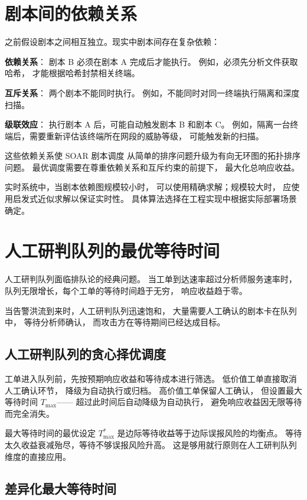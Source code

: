 \documentclass[11pt,a4paper]{article}
\begin{document}
\section{剧本间的依赖关系}

之前假设剧本之间相互独立。现实中剧本间存在复杂依赖：

\textbf{依赖关系}：
剧本 B 必须在剧本 A 完成后才能执行。
例如，必须先分析文件获取哈希，
才能根据哈希封禁相关终端。

\textbf{互斥关系}：
两个剧本不能同时执行。
例如，不能同时对同一终端执行隔离和深度扫描。

\textbf{级联效应}：
执行剧本 A 后，可能自动触发剧本 B 和剧本 C。
例如，隔离一台终端后，需要重新评估该终端所在网段的威胁等级，
可能触发新的扫描。

这些依赖关系使 SOAR 剧本调度
从简单的排序问题升级为有向无环图的拓扑排序问题。
最优调度需要在尊重依赖关系和互斥约束的前提下，
最大化总响应收益。

实时系统中，当剧本依赖图规模较小时，
可以使用精确求解；规模较大时，
应使用启发式近似求解以保证实时性。
具体算法选择在工程实现中根据实际部署场景确定。

\section{人工研判队列的最优等待时间}

人工研判队列面临排队论的经典问题。
当工单到达速率超过分析师服务速率时，
队列无限增长，每个工单的等待时间趋于无穷，
响应收益趋于零。

当告警洪流到来时，人工研判队列迅速饱和，
大量需要人工确认的剧本卡在队列中，
等待分析师确认，
而攻击方在等待期间已经达成目标。

\subsection{人工研判队列的贪心择优调度}

工单进入队列前，先按预期响应收益和等待成本进行筛选。
低价值工单直接取消人工确认环节，
降级为自动执行或归档。
高价值工单保留人工确认，
但设置最大等待时间 \(T_{\max}\)——
超过此时间后自动降级为自动执行，
避免响应收益因无限等待而完全消失。

最大等待时间的最优设定 \(T_{\max}^*\)
是边际等待收益等于边际误报风险的均衡点。
等待太久收益衰减殆尽，等待不够误报风险升高。
这是够用就行原则在人工研判队列维度的直接应用。

\subsection{差异化最大等待时间}
\end{document}
